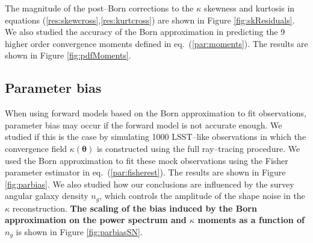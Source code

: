 \documentclass[reprint,aps,prd,superscriptaddress,showkeys,showpacs]{revtex4-1}
\newcommand\pt{\pmb{\theta}}
\begin{document}
The magnitude of the post--Born corrections to the $\kappa$ skewness and kurtosis in equations (\ref{res:skewcross},\ref{res:kurtcross}) are shown in Figure \ref{fig:skResiduals}.
We also studied the accuracy of the Born approximation in predicting the 9 higher order convergence moments defined in eq.~(\ref{par:moments}). The results are shown in Figure \ref{fig:pdfMoments}.

\subsection{Parameter bias}
When using forward models based on the Born approximation to fit observations, parameter bias may occur if the forward model is not accurate enough. We studied if this is the case by simulating 1000 LSST--like observations in which the convergence field $\kappa(\pt)$ is constructed using the full ray--tracing procedure. We used the Born approximation to fit these mock observations using the Fisher parameter estimator in eq.~(\ref{par:fisherest}). The results are shown in Figure \ref{fig:parbias}. We also studied how our conclusions are influenced by the survey angular galaxy density $n_g$, which controls the amplitude of the shape noise in the $\kappa$ reconstruction. \textbf{\color{red}The scaling of the bias induced by the Born approximation on the power spectrum and $\kappa$ moments as a function of} $n_g$ is shown in Figure \ref{fig:parbiasSN}.   

\end{document}
